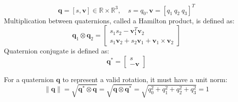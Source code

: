 \begin{equation}
	\boldsymbol{q} = \left[ s, \boldsymbol{v} \right] \in \mathbb{R} \times \mathbb{R}^3, \quad s = q_0, \boldsymbol{v} = \left[ q_1\ q_2\ q_3 \right]^T
	\label{eq:qt_vec}
\end{equation}
%
Multiplication between quaternions, called a Hamilton product, is defined as:
%
\begin{equation}
	\boldsymbol{q}_1 \otimes \boldsymbol{q}_2 = \begin{bmatrix} s_1s_2 - \boldsymbol{v}_1^T\boldsymbol{v}_2 \\ s_1\boldsymbol{v}_2 + s_2\boldsymbol{v}_1 + \boldsymbol{v}_1 \times \boldsymbol{v}_2 \end{bmatrix}
	\label{eq:qt_mult}
\end{equation}
%
Quaternion conjugate is defined as:
%
\begin{equation}
	\boldsymbol{q}^* = \begin{bmatrix} s \\ -\boldsymbol{v} \end{bmatrix}
	\label{eq:qt_conj}
\end{equation}

For a quaternion $\boldsymbol{q}$ to represent a valid rotation, it must have a unit norm:
\begin{equation}
	\|\boldsymbol{q}\| = \sqrt{\boldsymbol{q}^* \otimes \boldsymbol{q}} = \sqrt{\boldsymbol{q} \otimes \boldsymbol{q}^*} = \sqrt{q_0^2 + q_1^2 + q_2^2 + q_3^2} = 1
	\label{eq:qt:norm}
\end{equation}


